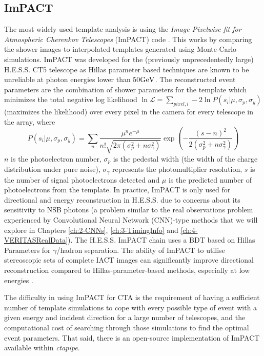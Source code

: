 \subsection{ImPACT}
The most widely used template analysis is using the \textit{Image Pixelwise fit for Atmospheric Cherenkov Telescopes} (ImPACT) code \cite{impact}. This works by comparing the shower images to interpolated templates generated using Monte-Carlo simulations. ImPACT was developed for the (previously unprecedentedly large) H.E.S.S. CT5 telescope as Hillas parameter based techniques are known to be unreliable at photon energies lower than $50 \rm{Ge}V$.  The reconstructed event parameters are the combination of shower parameters for the template which minimizes the total negative log likelihood $\ln\mathcal{L}=\sum_{pixel,i}-2\ln{P(s_i|\mu,\sigma_p,\sigma_y)}$(maximizes the likelihood) over every pixel in the camera for every telescope in the array, where
\begin{equation}
P(s_i|\mu,\sigma_p,\sigma_y)=\sum_n \frac{\mu^n e^{-\mu}}{n!\sqrt{2\pi (\sigma_p^2+n\sigma_{\gamma}^2)}} \exp \left(-\frac{(s-n)^2}{2(\sigma_p^2 + n \sigma_{\gamma}^2)} \right)
\end{equation}
$n$ is the photoelectron number, $\sigma_p$ is the pedestal width (the width of the charge distribution under pure noise), $\sigma_{\gamma}$ represents the photomultiplier resolution, $s$ is the number of signal photoelectrons detected and $\mu$ is the predicted number of photoelectrons from the template. In practice, ImPACT is only used for directional and energy reconstruction in H.E.S.S. due to concerns about its sensitivity to NSB photons (a problem similar to the real observations problem experienced by Convolutional Neural Network (CNN)-type methods that we will explore in Chapters \ref{ch:2-CNNs}, \ref{ch:3-TimingInfo} and \ref{ch:4-VERITASRealData}). The H.E.S.S. ImPACT chain uses a BDT based on Hillas Parameters for $\gamma$/hadron separation. The ability of ImPACT to utilise stereoscopic sets of complete IACT images can significantly improve directional reconstruction compared to Hillas-parameter-based methods, especially at low energies \cite{impact}.

The difficulty in using ImPACT for CTA is the requirement of having a sufficient number of template simulations to cope with every possible type of event with a given energy and incident direction for a large number of telescopes, and the computational cost of searching through those simulations to find the optimal event parameters. That said, there is an open-source implementation of ImPACT available within \textit{ctapipe}.

